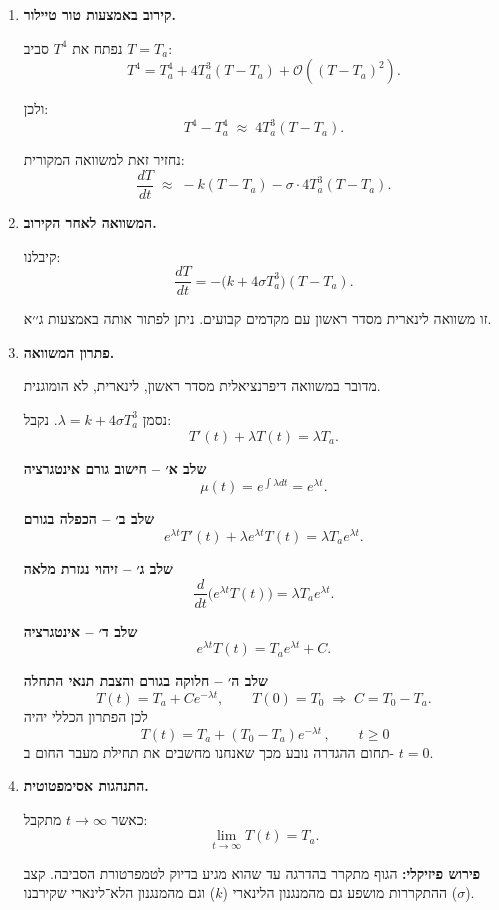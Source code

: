 \documentclass{article}
\numberwithin{equation}{section}
\begin{document}
\begin{enumerate}[label=\alph*.]

\item \textbf{קירוב באמצעות טור טיילור.}  

נפתח את $T^4$ סביב $T=T_a$:  
\[
T^4 = T_a^4 + 4T_a^3 (T-T_a) + \mathcal{O}((T-T_a)^2).
\]

ולכן:
\[
T^4 - T_a^4 \;\approx\; 4T_a^3 (T-T_a).
\]

נחזיר זאת למשוואה המקורית:
\[
\frac{dT}{dt} \;\approx\; -k(T-T_a) - \sigma \cdot 4T_a^3 (T-T_a).
\]

\item \textbf{המשוואה לאחר הקירוב.}  

קיבלנו:
\[
\frac{dT}{dt} = -\big(k+4\sigma T_a^3\big)(T-T_a).
\]

זו משוואה לינארית מסדר ראשון עם מקדמים קבועים.  
ניתן לפתור אותה באמצעות ג׳׳א.

\item

\textbf{פתרון המשוואה.}  

מדובר במשוואה דיפרנציאלית מסדר ראשון, לינארית, לא הומוגנית.  

נסמן \(\lambda = k+4\sigma T_a^3\). נקבל:
\[
T'(t) + \lambda T(t) = \lambda T_a.
\]

\textbf{שלב א׳ – חישוב גורם אינטגרציה}  
\[
\mu(t) = e^{\int \lambda dt} = e^{\lambda t}.
\]

\textbf{שלב ב׳ – הכפלה בגורם}  
\[
e^{\lambda t}T'(t) + \lambda e^{\lambda t}T(t) = \lambda T_a e^{\lambda t}.
\]

\textbf{שלב ג׳ – זיהוי נגזרת מלאה}  
\[
\frac{d}{dt}\!\Big(e^{\lambda t}T(t)\Big) = \lambda T_a e^{\lambda t}.
\]

\textbf{שלב ד׳ – אינטגרציה}  
\[
e^{\lambda t}T(t) = T_a e^{\lambda t} + C.
\]

\textbf{שלב ה׳ – חלוקה בגורם והצבת תנאי התחלה}  
\[
T(t) = T_a + Ce^{-\lambda t}, \qquad T(0)=T_0 \;\Rightarrow\; C=T_0-T_a.
\]
לכן הפתרון הכללי יהיה
\[
\boxed{\, T(t) = T_a + (T_0-T_a)e^{-\lambda t} \,,\qquad t\geq0}
\]
תחום ההגדרה נובע מכך שאנחנו מחשבים את תחילת מעבר החום ב- $t=0$.


\item \textbf{התנהגות אסימפטוטית.}  

כאשר $t \to \infty$ מתקבל:
\[
\lim_{t \to \infty} T(t) = T_a.
\]

\textbf{פירוש פיזיקלי:} הגוף מתקרר בהדרגה עד שהוא מגיע בדיוק לטמפרטורת הסביבה.  
קצב ההתקררות מושפע גם מהמנגנון הלינארי ($k$) וגם מהמנגנון הלא־לינארי שקירבנו ($\sigma$).
\end{enumerate}
\end{document}
